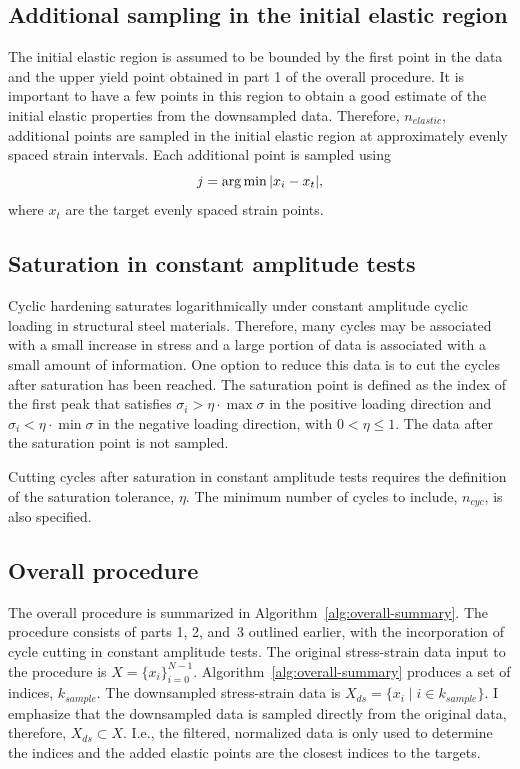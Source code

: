 \documentclass[a4paper,11pt]{article}
\begin{document}
\subsection{Additional sampling in the initial elastic region}

The initial elastic region is assumed to be bounded by the first point in the data and the upper yield point obtained in part 1 of the overall procedure.
It is important to have a few points in this region to obtain a good estimate of the initial elastic properties from the downsampled data.
Therefore, $n_{elastic}$, additional points are sampled in the initial elastic region at approximately evenly spaced strain intervals.
Each additional point is sampled using
\begin{equation}
    j = \arg \min \abs{x_i - x_{t}},
\end{equation}
where $x_t$ are the target evenly spaced strain points.

\subsection{Saturation in constant amplitude tests}

Cyclic hardening saturates logarithmically under constant amplitude cyclic loading in structural steel materials.
Therefore, many cycles may be associated with a small increase in stress and a large portion of data is associated with a small amount of information.
One option to reduce this data is to cut the cycles after saturation has been reached.
The saturation point is defined as the index of the first peak that satisfies $\sigma_i > \eta \cdot \max \sigma$ in the positive loading direction and $\sigma_i < \eta \cdot \min \sigma$ in the negative loading direction, with $0 < \eta \leq 1$.
The data after the saturation point is not sampled.

Cutting cycles after saturation in constant amplitude tests requires the definition of the saturation tolerance, $\eta$.
The minimum number of cycles to include, $n_{cyc}$, is also specified.


\subsection{Overall procedure}

The overall procedure is summarized in Algorithm~\ref{alg:overall-summary}.
The procedure consists of parts 1, 2, and~3 outlined earlier, with the incorporation of cycle cutting in constant amplitude tests.
The original stress-strain data input to the procedure is $X = \{x_i \}_{i=0}^{N-1}$.
Algorithm~\ref{alg:overall-summary} produces a set of indices, $k_{sample}$.
The downsampled stress-strain data is $X_{ds} = \{ x_i \mid i \in k_{sample} \}$.
I emphasize that the downsampled data is sampled directly from the original data, therefore, $X_{ds} \subset X$.
I.e., the filtered, normalized data is only used to determine the indices and the added elastic points are the closest indices to the targets.
\end{document}
